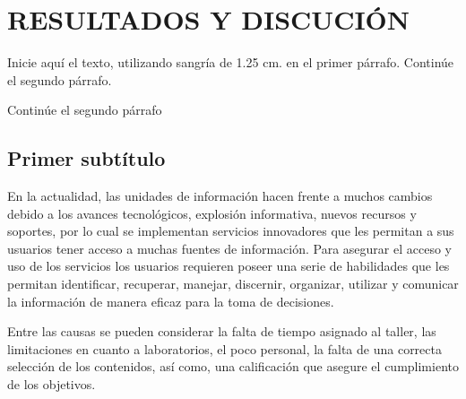 \chapter{RESULTADOS Y DISCUCI\'ON}

Inicie aquí el texto, utilizando sangría de 1.25 cm. en el primer
párrafo. Continúe el segundo párrafo.

Continúe el segundo párrafo

\section{Primer subtítulo}

En la actualidad, las unidades de información hacen frente a muchos cambios
debido a los avances tecnológicos, explosión informativa, nuevos recursos y
soportes, por lo cual se implementan servicios innovadores que les permitan a
sus usuarios tener acceso a muchas fuentes de información. Para asegurar el
acceso y uso de los servicios los usuarios requieren poseer una serie de
habilidades que les permitan identificar, recuperar, manejar, discernir,
organizar, utilizar y comunicar la información de manera eficaz para la toma de
decisiones.

Entre las causas se pueden considerar la falta de tiempo asignado al taller,
las limitaciones en cuanto a laboratorios, el poco personal, la falta de una
correcta selección de los contenidos, así como, una calificación que asegure el
cumplimiento de los objetivos.

